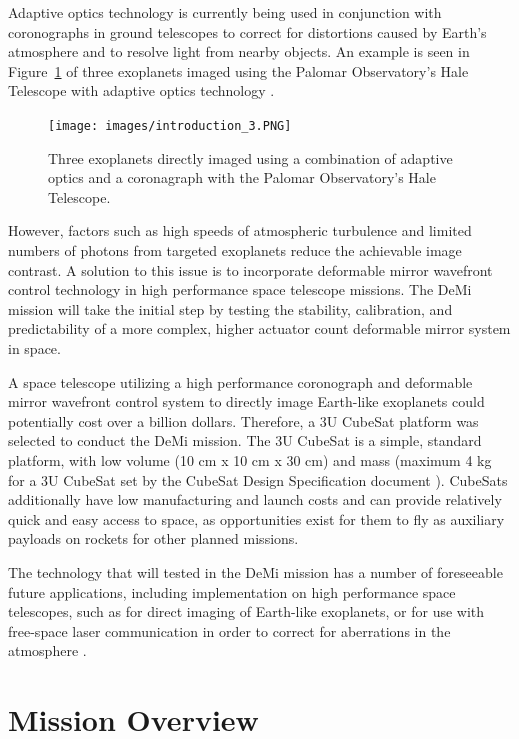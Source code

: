 \documentclass[12pt]{article}
\begin{document}
Adaptive optics technology is currently being used in conjunction with coronographs in ground telescopes to correct for distortions caused by Earth's atmosphere and to resolve light from nearby objects.  An example is seen in Figure~\ref{fig:Intro_exo} of three exoplanets imaged using the Palomar Observatory's Hale Telescope with adaptive optics technology \cite{serabyn2010}.

\begin{figure}[!ht]
\centering
\texttt{[image: images/introduction\_3.PNG]}
\caption{Three exoplanets directly imaged using a combination of adaptive optics and a coronagraph with the Palomar Observatory’s Hale Telescope.}
\label{fig:Intro_exo}
\end{figure}

However, factors such as high speeds of atmospheric turbulence and limited numbers of photons from targeted exoplanets reduce the achievable image contrast.  A solution to this issue is to incorporate deformable mirror wavefront control technology in high performance space telescope missions.  The DeMi mission will take the initial step by testing the stability, calibration, and predictability of a more complex, higher actuator count deformable mirror system in space.     

A space telescope utilizing a high performance coronograph and deformable mirror wavefront control system to directly image Earth-like exoplanets could potentially cost over a billion dollars.  Therefore, a 3U CubeSat platform was selected to conduct the DeMi mission.  The 3U CubeSat is a simple, standard platform, with low volume (10 cm x 10 cm x 30 cm) and mass (maximum 4 kg for a 3U CubeSat set by the CubeSat Design Specification document \cite{cubesat-specs}).   CubeSats additionally have low manufacturing and launch costs and can provide relatively quick and easy access to space, as opportunities exist for them to fly as auxiliary payloads on rockets for other planned missions. 

The technology that will tested in the DeMi mission has a number of foreseeable future applications, including implementation on high performance space telescopes, such as for direct imaging of Earth-like exoplanets, or for use with free-space laser communication in order to correct for aberrations in the atmosphere \cite{cahoy-unpublished}.

\newpage
\section{Mission Overview}
\end{document}
